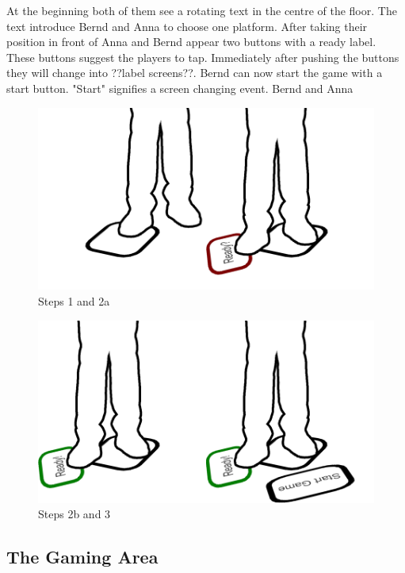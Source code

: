 \documentclass{sigchi}
\begin{document}
At the beginning both of them see a rotating text in the centre of the floor. The text introduce Bernd and Anna to choose one platform. After taking their position in front of Anna and Bernd appear two buttons with a ready label. These buttons suggest the players to tap. Immediately after pushing the buttons they will change into ??label screens??. Bernd can now start the game with a start button. "Start" signifies a screen changing event. Bernd and Anna 








\begin{figure}[H]
\centering
\includegraphics[width=0.9\columnwidth]{walkthrough/klein/beamingarea1+2a}
\caption{Steps 1 and 2a}
\label{fig:gamingArea}
\end{figure}


\begin{figure}[H]
\centering
\includegraphics[width=0.9\columnwidth]{walkthrough/klein/beamingarea2b+3}
\caption{Steps 2b and 3}
\label{fig:gamingArea}
\end{figure}




\subsection{The Gaming Area}
\end{document}
